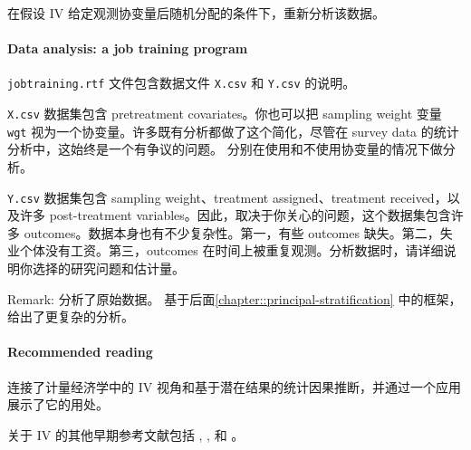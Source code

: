 在假设 IV 给定观测协变量后随机分配的条件下，重新分析该数据。

 
 
 \paragraph{Data analysis: a job training program}

\texttt{jobtraining.rtf} 文件包含数据文件 \texttt{X.csv} 和 \texttt{Y.csv} 的说明。

\texttt{X.csv} 数据集包含 pretreatment covariates。你也可以把 sampling weight 变量 \texttt{wgt} 视为一个协变量。许多既有分析都做了这个简化，尽管在 survey data 的统计分析中，这始终是一个有争议的问题。
分别在使用和不使用协变量的情况下做分析。

\texttt{Y.csv} 数据集包含 sampling weight、treatment assigned、treatment received，以及许多 post-treatment variables。因此，取决于你关心的问题，这个数据集包含许多 outcomes。数据本身也有不少复杂性。第一，有些 outcomes 缺失。第二，失业个体没有工资。第三，outcomes 在时间上被重复观测。分析数据时，请详细说明你选择的研究问题和估计量。

Remark: 
\citet{schochet2008does} 分析了原始数据。
\citet{frumento2012evaluating} 基于后面\cref{chapter::principal-stratification} 中的框架，给出了更复杂的分析。


 \paragraph{Recommended reading}

\citet{angrist1996identification} 连接了计量经济学中的 IV 视角和基于潜在结果的统计因果推断，并通过一个应用展示了它的用处。

关于 IV 的其他早期参考文献包括 \citet{permutt1989simultaneous}, \citet{sommer1991estimating}, \citet{baker1994paired} 和 \citet{cuzick1997adjusting}。
